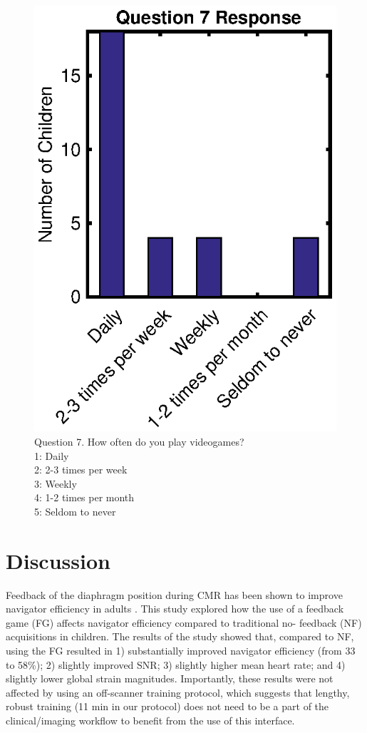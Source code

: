 	\begin{figure}
		\centering
		\includegraphics{figures/gamepaper/Question7}
		\caption[Survey Question 7]{Question 7. How often do you play videogames? \\ 1: Daily\\ 2: 2-3 times per week\\ 3: Weekly\\ 4:  1-2 times per month\\ 5: Seldom to never}
		\label{fig:question7}
	\end{figure}

\section{Discussion}
	Feedback of the diaphragm position during CMR has been shown to improve navigator efficiency in adults \cite{Feuerlein2009,Jhooti2011}. This study explored how the use of a feedback game (FG) affects navigator efficiency compared to traditional no- feedback (NF) acquisitions in children. The results of the study showed that, compared to NF, using the FG resulted in 1) substantially improved navigator efficiency (from 33 to 58\%); 2) slightly improved SNR; 3) slightly higher mean heart rate; and 4) slightly lower global strain magnitudes. Importantly, these results were not affected by using an off-scanner training protocol, which suggests that lengthy, robust training (11 min in our protocol) does not need to be a part of the clinical/imaging workflow to benefit from the use of this interface.

